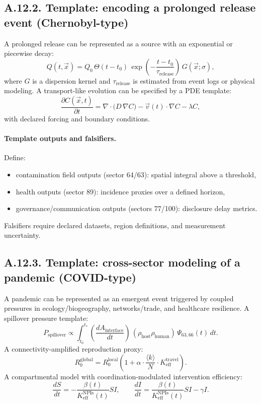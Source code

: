 \documentclass[13pt,a4paper]{article}
\begin{document}
	\subsection*{A.12.2. Template: encoding a prolonged release event (Chernobyl-type)}
	
	A prolonged release can be represented as a source with an exponential or piecewise decay:
	$$
	Q(t,\vec{x}) = Q_0\,\Theta(t-t_0)\,\exp\!\left(-\frac{t-t_0}{\tau_{\mathrm{release}}}\right)\,G(\vec{x};\sigma),
	$$
	where $G$ is a dispersion kernel and $\tau_{\mathrm{release}}$ is estimated from event logs or physical modeling. A transport-like evolution can be specified by a PDE template:
	$$
	\frac{\partial C(\vec{x},t)}{\partial t}
	= \nabla\cdot\big(D\,\nabla C\big) - \vec{v}(t)\cdot\nabla C - \lambda C,
	$$
	with declared forcing and boundary conditions.
	
	\paragraph{Template outputs and falsifiers.}
	Define:
	\begin{itemize}[leftmargin=*]
		\item contamination field outputs (sector 64/63): spatial integral above a threshold,
		\item health outputs (sector 89): incidence proxies over a defined horizon,
		\item governance/communication outputs (sectors 77/100): disclosure delay metrics.
	\end{itemize}
	Falsifiers require declared datasets, region definitions, and measurement uncertainty.
	
	\subsection*{A.12.3. Template: cross-sector modeling of a pandemic (COVID-type)}
	
	A pandemic can be represented as an emergent event triggered by coupled pressures in ecology/biogeography, networks/trade, and healthcare resilience. A spillover pressure template:
	$$
	P_{\mathrm{spillover}} \propto \int_{t_0}^{t_{*}}
	\left(\frac{dA_{\mathrm{interface}}}{dt}\right)\,
	\left(\rho_{\mathrm{host}}\rho_{\mathrm{human}}\right)\,
	\Psi_{63,66}(t)\,dt.
	$$
	A connectivity-amplified reproduction proxy:
	$$
	R_0^{\mathrm{global}} = R_0^{\mathrm{local}}\left(1+\alpha\cdot \frac{\langle k\rangle}{N}\cdot K_{\mathrm{eff}}^{\mathrm{travel}}\right).
	$$
	A compartmental model with coordination-modulated intervention efficiency:
	$$
	\frac{dS}{dt} = - \frac{\beta(t)}{K_{\mathrm{eff}}^{\mathrm{NPIs}}(t)}SI,\qquad
	\frac{dI}{dt} = \frac{\beta(t)}{K_{\mathrm{eff}}^{\mathrm{NPIs}}(t)}SI - \gamma I.
	$$
	
\end{document}

